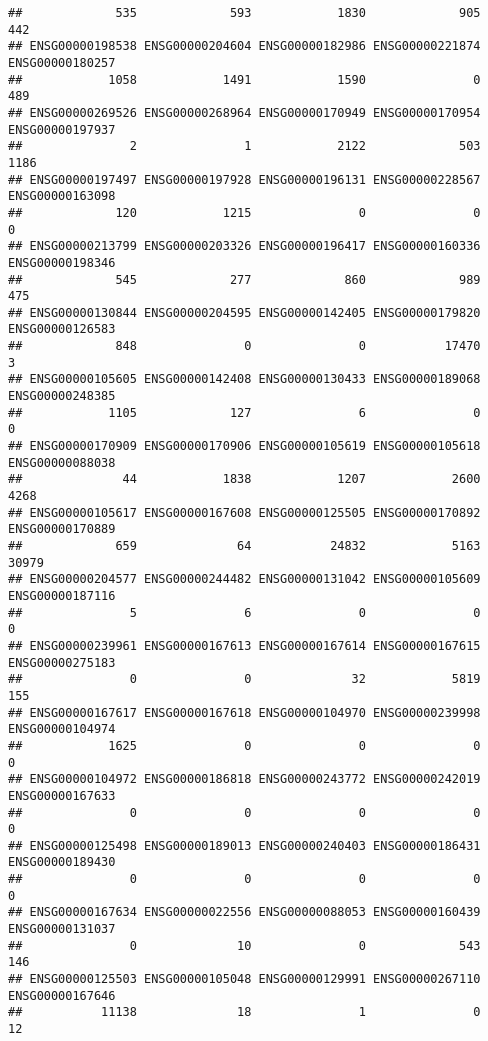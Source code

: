 \documentclass[
]{article}
\begin{document}
\begin{verbatim}
##             535             593            1830             905             442 
## ENSG00000198538 ENSG00000204604 ENSG00000182986 ENSG00000221874 ENSG00000180257 
##            1058            1491            1590               0             489 
## ENSG00000269526 ENSG00000268964 ENSG00000170949 ENSG00000170954 ENSG00000197937 
##               2               1            2122             503            1186 
## ENSG00000197497 ENSG00000197928 ENSG00000196131 ENSG00000228567 ENSG00000163098 
##             120            1215               0               0               0 
## ENSG00000213799 ENSG00000203326 ENSG00000196417 ENSG00000160336 ENSG00000198346 
##             545             277             860             989             475 
## ENSG00000130844 ENSG00000204595 ENSG00000142405 ENSG00000179820 ENSG00000126583 
##             848               0               0           17470               3 
## ENSG00000105605 ENSG00000142408 ENSG00000130433 ENSG00000189068 ENSG00000248385 
##            1105             127               6               0               0 
## ENSG00000170909 ENSG00000170906 ENSG00000105619 ENSG00000105618 ENSG00000088038 
##              44            1838            1207            2600            4268 
## ENSG00000105617 ENSG00000167608 ENSG00000125505 ENSG00000170892 ENSG00000170889 
##             659              64           24832            5163           30979 
## ENSG00000204577 ENSG00000244482 ENSG00000131042 ENSG00000105609 ENSG00000187116 
##               5               6               0               0               0 
## ENSG00000239961 ENSG00000167613 ENSG00000167614 ENSG00000167615 ENSG00000275183 
##               0               0              32            5819             155 
## ENSG00000167617 ENSG00000167618 ENSG00000104970 ENSG00000239998 ENSG00000104974 
##            1625               0               0               0               0 
## ENSG00000104972 ENSG00000186818 ENSG00000243772 ENSG00000242019 ENSG00000167633 
##               0               0               0               0               0 
## ENSG00000125498 ENSG00000189013 ENSG00000240403 ENSG00000186431 ENSG00000189430 
##               0               0               0               0               0 
## ENSG00000167634 ENSG00000022556 ENSG00000088053 ENSG00000160439 ENSG00000131037 
##               0              10               0             543             146 
## ENSG00000125503 ENSG00000105048 ENSG00000129991 ENSG00000267110 ENSG00000167646 
##           11138              18               1               0              12 

\end{verbatim}
\end{document}
